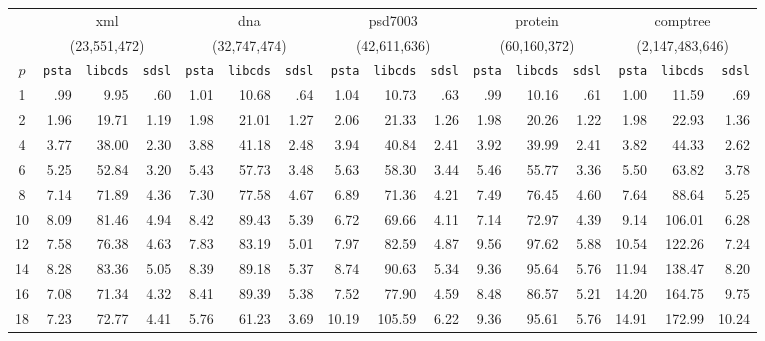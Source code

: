 \setlength{\tabcolsep}{3pt}
\begin{table}[ht]
  \centering
  \begin{tabular}{crrrrrrrrrrrrrrr}
    & \multicolumn{3}{c}{xml} & \multicolumn{3}{c}{dna} & \multicolumn{3}{c}{psd7003} & \multicolumn{3}{c}{protein} & \multicolumn{3}{c}{comptree}\\
    &  \multicolumn{3}{c}{(23,551,472)} & \multicolumn{3}{c}{(32,747,474)} & \multicolumn{3}{c}{(42,611,636)} & \multicolumn{3}{c}{(60,160,372)} & \multicolumn{3}{c}{(2,147,483,646)}\\
\hline
    $p$ & \verb|psta| & \verb|libcds| & \verb|sdsl|  & \verb|psta| & \verb|libcds| & \verb|sdsl| & \verb|psta| & \verb|libcds| & \verb|sdsl| & \verb|psta| & \verb|libcds| & \verb|sdsl| & \verb|psta| & \verb|libcds| & \verb|sdsl|\\
\hline
 1   &  .99  &  9.95  & .60  &  1.01 & 10.68  & .64  &  1.04  & 10.73  & .63  &  .99   &  10.16  &  .61   & 1.00  & 11.59  & .69   \\
 2   &  1.96 &  19.71 & 1.19 &  1.98 & 21.01  & 1.27 &  2.06  & 21.33  & 1.26 &  1.98  &  20.26  &  1.22  & 1.98  & 22.93  & 1.36  \\
 4   &  3.77 &  38.00 & 2.30 &  3.88 & 41.18  & 2.48 &  3.94  & 40.84  & 2.41 &  3.92  &  39.99  &  2.41  & 3.82  & 44.33  & 2.62  \\
 6   &  5.25 &  52.84 & 3.20 &  5.43 & 57.73  & 3.48 &  5.63  & 58.30  & 3.44 &  5.46  &  55.77  &  3.36  & 5.50  & 63.82  & 3.78  \\
 8   &  7.14 &  71.89 & 4.36 &  7.30 & 77.58  & 4.67 &  6.89  & 71.36  & 4.21 &  7.49  &  76.45  &  4.60  & 7.64  & 88.64  & 5.25  \\
 10  &  8.09 &  81.46 & 4.94 &  8.42 & 89.43  & 5.39 &  6.72  & 69.66  & 4.11 &  7.14  &  72.97  &  4.39  & 9.14  & 106.01 & 6.28  \\
 12  &  7.58 &  76.38 & 4.63 &  7.83 & 83.19  & 5.01 &  7.97  & 82.59  & 4.87 &  9.56  &  97.62  &  5.88  & 10.54 & 122.26 & 7.24  \\
 14  &  8.28 &  83.36 & 5.05 &  8.39 & 89.18  & 5.37 &  8.74  & 90.63  & 5.34 &  9.36  &  95.64  &  5.76  & 11.94 & 138.47 & 8.20  \\
 16  &  7.08 &  71.34 & 4.32 &  8.41 & 89.39  & 5.38 &  7.52  & 77.90  & 4.59 &  8.48  &  86.57  &  5.21  & 14.20 & 164.75 & 9.75  \\
 18  &  7.23 &  72.77 & 4.41 &  5.76 & 61.23  & 3.69 &  10.19 & 105.59 & 6.22 &  9.36  &  95.61  &  5.76  & 14.91 & 172.99 & 10.24\\

\end{tabular}
\end{table}

